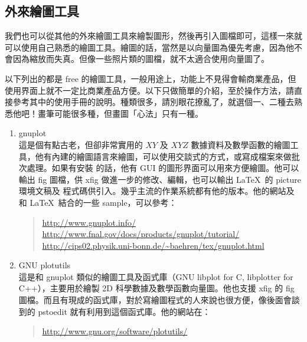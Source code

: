 \subsection{外來繪圖工具}

我們也可以從其他的外來繪圖工具來繪製圖形，然後再引入圖檔即可，這樣一來就可以使用自己熟悉的繪圖工具。繪圖的話，當然是以向量圖為優先考慮，因為他不會因為縮放而失真。但像一些照片類的圖檔，就不太適合使用向量圖了。

以下列出的都是 free 的繪圖工具，一般用途上，功能上不見得會輸商業產品，但使用界面上就不一定比商業產品方便。以下只做簡單的介紹，至於操作方法，請直接參考其中的使用手冊的說明。種類很多，請別眼花撩亂了，就選個一、二種去熟悉他吧！畫筆可能很多種，但畫圖「心法」只有一種。

\begin{enumerate}
  \item {\sffamily gnuplot}\\
        這是個有點古老，但卻非常實用的 $XY$ 及 $XYZ$ 數據資料及數學函數的繪圖工具，他有內建的繪圖語言來繪圖，可以使用交談式的方式，或寫成檔案來做批次處理。如果有安裝
        的話，他有 GUI 的圖形界面可以用來方便繪圖。他可以輸出 fig 圖檔，供 {\sffamily xfig} 做進一步的修改、編輯，也可以輸出 \LaTeX\ 的 {\ttfamily picture} 環境文稿及 \MP{} 程式碼供引入。幾乎主流的作業系統都有他的版本。他的網站及和 \LaTeX\ 結合的一些 sample，可以參考：

        \begin{quote}
          \url{http://www.gnuplot.info/}\\
          \url{http://www.fnal.gov/docs/products/gnuplot/tutorial/}\\
          \url{http://cips02.physik.uni-bonn.de/~baehren/tex/gnuplot.html}
        \end{quote}

  \item {\sffamily GNU plotutils}\\
        這是和 gnuplot 類似的繪圖工具及函式庫（GNU libplot for C, libplotter for C++），主要用於繪製 2D 科學數據及數學函數向量圖。他也支援 {\sffamily xfig} 的 fig 圖檔。而且有現成的函式庫，對於寫繪圖程式的人來說也很方便，像後面會談到的 {\sffamily pstoedit} 就有利用到這個函式庫。他的網站在：

        \begin{quote}
          \url{http://www.gnu.org/software/plotutils/}
        \end{quote}


\end{enumerate}
